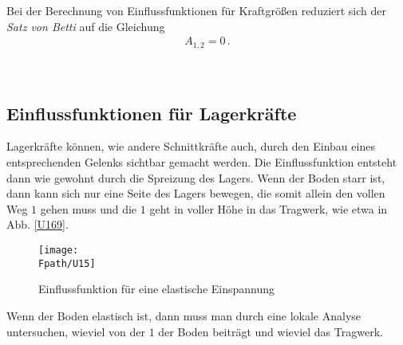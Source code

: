 \hspace*{-12pt}\colorbox{highlightBlue}{\parbox{0.98\textwidth}{Bei der Berechnung von Einflussfunktionen f\"{u}r Kraftgr\"{o}{\ss}en reduziert sich der {\em Satz von Betti\/}  auf die Gleichung
\begin{align}
A_{1,2} =  0\,.
\end{align}}}\\

{\textcolor{sectionTitleBlue}{\section{Einflussfunktionen f\"{u}r Lagerkr\"{a}fte}}}
Lagerkr\"{a}fte k\"{o}nnen, wie andere Schnittkr\"{a}fte auch, durch den Einbau eines entsprechenden Gelenks sichtbar gemacht werden.
Die Einflussfunktion entsteht dann wie gewohnt durch die Spreizung des Lagers.  Wenn der Boden starr ist, dann kann sich nur eine Seite des Lagers bewegen, die somit allein den vollen Weg $1$ gehen muss und die $1$ geht in voller H\"{o}he in das Tragwerk, wie etwa in Abb. \ref{U169}.

\begin{figure}[tbp]
\centering
\if {} \sidecaption \fi
\texttt{[image: \\Fpath/U15]}
\caption{Einflussfunktion f\"{u}r eine elastische Einspannung} \label{U15}
\end{figure}%

Wenn der Boden elastisch ist, dann muss man durch eine lokale Analyse untersuchen, wieviel
von der $1$ der Boden beitr\"{a}gt und wieviel das Tragwerk.


